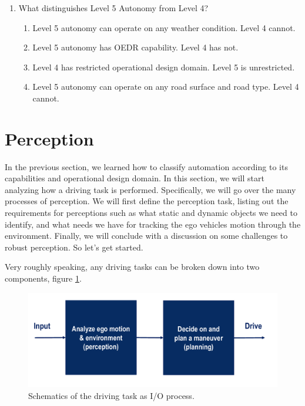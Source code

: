 \begin{enumerate}
\item What distinguishes Level 5 Autonomy from Level 4?


\begin{enumerate}
\item Level 5 autonomy can operate on any weather condition. Level 4 cannot.
\item Level 5 autonomy has OEDR capability. Level 4 has not.
\item Level 4 has restricted operational design domain. Level 5 is unrestricted.
\item Level 5 autonomy can operate on any road surface and road type. Level 4 cannot.
\end{enumerate}

\end{enumerate}


\section{Perception}
\label{perception}
In the previous section, we learned how to classify automation according to its capabilities and operational design domain. 
In this section, we will start analyzing how a driving task is performed. Specifically, we will go over the many processes of perception. 
We will first define the perception task, listing out the requirements for perceptions such as what static and dynamic objects we need to identify, 
and what needs we have for tracking the ego vehicles motion through the environment. 
Finally, we will conclude with a discussion on some challenges to robust perception. So let's get started.


Very roughly speaking, any driving tasks can be broken down into two components, figure \ref{driving_task}. 

\begin{figure}[!htb]
\begin{center}
\includegraphics[scale=0.280]{img/intro_self_driving/driving_task.jpeg}
\end{center}
\caption{Schematics of the driving task as I/O process.}
\label{driving_task}
\end{figure}

